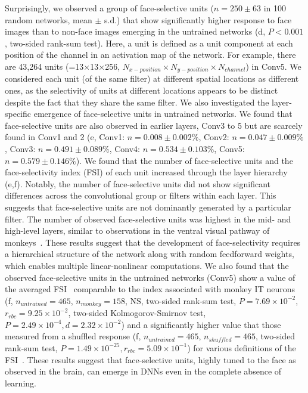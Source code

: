 \documentclass[final,3p,times,twocolumn]{elsarticle}
\begin{document}
Surprisingly, we observed a group of face-selective units ($ n = 250 \pm 63 $ in 100 random networks, mean $ \pm $ s.d.) that show significantly higher response to face images than to non-face images emerging in the untrained networks (d, $ P<0.001 $, two-sided rank-sum test).
Here, a unit is defined as a unit component at each position of the channel in an activation map of the network.
For example, there are 43,264 units (=13$\times$13$\times$256, $ N_{x-position} \times N_{y-position} \times N_{channel} $) in Conv5.
We considered each unit (of the same filter) at different spatial locations as different ones, as the selectivity of units at different locations appears to be distinct despite the fact that they share the same filter.
We also investigated the layer-specific emergence of face-selective units in untrained networks.
We found that face-selective units are also observed in earlier layers, Conv3 to 5 but are scarcely found in Conv1 and 2 (e, 
Conv1: $ n=0.008 \pm0.002\% $, 
Conv2: $ n=0.047 \pm 0.009\% $, 
Conv3: $ n=0.491 \pm 0.089\% $, 
Conv4: $ n=0.534 \pm 0.103\% $,
Conv5: $ n=0.579 \pm 0.146\% $).
We found that the number of face-selective units and the face-selectivity index (FSI) of each unit increased through the layer hierarchy (e,f).
Notably, the number of face-selective units did not show significant differences across the convolutional group or filters within each layer.
This suggests that face-selective units are not dominantly generated by a particular filter.
The number of observed face-selective units was highest in the mid- and high-level layers, similar to observations in the ventral visual pathway of monkeys~\cite{tsao2006cortical,livingstone2017development}.
These results suggest that the development of face-selectivity requires a hierarchical structure of the network along with random feedforward weights, which enables multiple linear-nonlinear computations.
We also found that the observed face-selective units in the untrained networks (Conv5) show a value of the averaged FSI~\cite{tsao2006cortical,freiwald2010functional} comparable to the index associated with monkey IT neurons (f, $ n_{untrained} = 465 $, $ n_{monkey} = 158 $, NS, two-sided rank-sum test, $ P=7.69 \times 10 ^{-2} $, $ r_{rbc} = 9.25 \times 10^{-2} $, two-sided Kolmogorov-Smirnov test, $ P=2.49 \times 10^{-4}, d=2.32 \times 10^{-2} $)
and a significantly higher value that those measured from a shuffled response (f, $ n_{untrained} = 465 $, $ n_{shuffled} = 465 $, two-sided rank-sum test, $ P=1.49 \times 10^{-25}, r_{rbc} = 5.09 \times 10^{-1} $) for various definitions of the FSI~\cite{tsao2006cortical,aparicio2016neurophysiological,duyck2021color}.
These results suggest that face-selective units, highly tuned to the face as observed in the brain, can emerge in DNNs even in the complete absence of learning.
\end{document}
